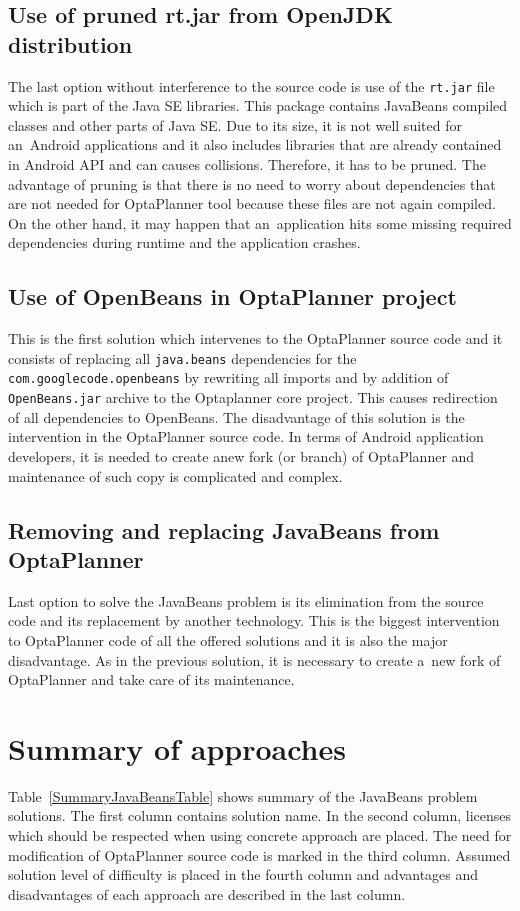 \subsection{Use of pruned rt.jar from OpenJDK distribution}\label{PrunedJarSection}
The last option without interference to the source code is use of the \texttt{rt.jar} file which is part of the Java SE
libraries. This package contains JavaBeans compiled classes and other parts of Java SE. Due to its size, it is not well
suited for an~Android applications and it also includes libraries that are already contained in Android API and can
causes collisions. Therefore, it has to be pruned. The advantage of pruning is that there is no need to worry about
dependencies that are not needed for OptaPlanner tool because these files are not again compiled. On the other hand,
it may happen that an~application hits some missing required dependencies during runtime and the application crashes.

\subsection{Use of OpenBeans in OptaPlanner project}\label{UseOpenBeansSection}
This is the first solution which intervenes to the OptaPlanner source code and it consists of replacing all
\texttt{java.beans} dependencies for the \texttt{com.googlecode.openbeans} by rewriting all imports and by addition of
\texttt{OpenBeans.jar} archive to the Optaplanner core project. This causes redirection of all dependencies to
OpenBeans. The disadvantage of this solution is the intervention in the OptaPlanner source code. In terms of Android
application developers, it is needed to create anew fork (or branch) of OptaPlanner and maintenance of such copy is
complicated and complex.

\subsection{Removing and replacing JavaBeans from OptaPlanner}\label{RemoveJavaBeansSection}
Last option to solve the JavaBeans problem is its elimination from the source code and its replacement by another
technology. This is the biggest intervention to OptaPlanner code of all the offered solutions and it is also the major
disadvantage. As in the previous solution, it is necessary to create a~new fork of OptaPlanner and take care of its
maintenance.

\section{Summary of approaches}\label{SummarySection}
Table~\ref{SummaryJavaBeansTable} shows summary of the JavaBeans problem solutions. The first column contains solution
name. In the second column, licenses which should be respected when using concrete approach are placed. The need for
modification of OptaPlanner source code is marked in the third column. Assumed solution level of difficulty is placed in
the fourth column and advantages and disadvantages of each approach are described in the last column.

